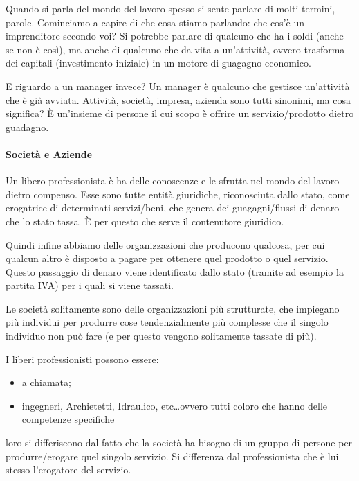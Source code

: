 Quando si parla del mondo del lavoro spesso si sente parlare di molti termini,
parole. Cominciamo a capire di che cosa stiamo parlando: che cos'è un
imprenditore secondo voi? Si potrebbe parlare di qualcuno che ha i soldi (anche
se non è così), ma anche di qualcuno che da vita a un'attività, ovvero
trasforma dei capitali (investimento iniziale) in un motore di guagagno
economico.

E riguardo a un manager invece? Un manager è qualcuno che gestisce un'attività
che è già avviata. Attività, società, impresa, azienda sono tutti sinonimi, ma
cosa significa? È un'insieme di persone il cui scopo è offrire un
servizio/prodotto dietro guadagno.

\paragraph*{Società e Aziende} Un libero professionista è ha delle conoscenze e
le sfrutta nel mondo del lavoro dietro compenso. Esse sono tutte entità
giuridiche, riconosciuta dallo stato, come erogatrice di determinati
servizi/beni, che genera dei guagagni/flussi di denaro che lo stato tassa. È per
questo che serve il contenutore giuridico.

Quindi infine abbiamo delle organizzazioni che producono qualcosa, per cui
qualcun altro è disposto a pagare per ottenere quel prodotto o quel servizio.
Questo passaggio di denaro viene identificato dallo stato (tramite ad esempio
la partita IVA) per i quali si viene tassati.

Le società solitamente sono delle organizzazioni più strutturate, che impiegano
più individui per produrre cose tendenzialmente più complesse che il singolo
individuo non può fare (e per questo vengono solitamente tassate di più).

I liberi professionisti possono essere:
\begin{itemize}
 \item a chiamata;
 \item ingegneri, Archietetti, Idraulico, etc\dots ovvero tutti coloro che
hanno delle competenze specifiche
\end{itemize}
loro si differiscono dal fatto che la società ha bisogno di un gruppo di
persone per produrre/erogare quel singolo servizio. Si differenza dal
professionista che è lui stesso l'erogatore del servizio.

